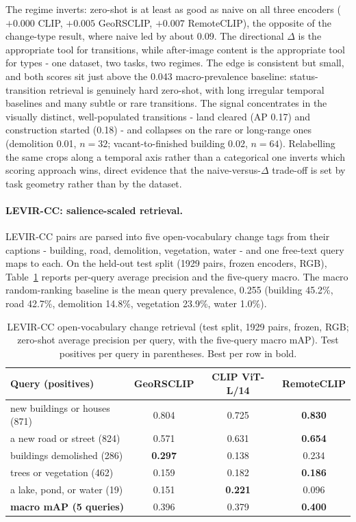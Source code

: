 \documentclass{article}
\begin{document}
The regime inverts: zero-shot is at least as good as naive on all three encoders
($+0.000$ CLIP, $+0.005$ GeoRSCLIP, $+0.007$ RemoteCLIP), the opposite of the
change-type result, where naive led by about 0.09. The directional $\Delta$ is the
appropriate tool for transitions, while after-image content is the appropriate
tool for types - one dataset, two tasks, two regimes. The edge is consistent but
small, and both scores sit just above the 0.043 macro-prevalence baseline:
status-transition retrieval is genuinely hard zero-shot, with long irregular
temporal baselines and many subtle or rare transitions. The signal concentrates in
the visually distinct, well-populated transitions - land cleared (AP 0.17) and
construction started (0.18) - and collapses on the rare or long-range ones
(demolition 0.01, $n=32$; vacant-to-finished building 0.02, $n=64$). Relabelling
the same crops along a temporal axis rather than a categorical one inverts which
scoring approach wins, direct evidence that the naive-versus-$\Delta$ trade-off is
set by task geometry rather than by the dataset.


\paragraph{LEVIR-CC: salience-scaled retrieval.}
LEVIR-CC pairs are parsed into five open-vocabulary change tags from their
captions - building, road, demolition, vegetation, water - and one free-text
query maps to each. On the held-out test split (1929 pairs, frozen encoders,
RGB), Table~\ref{tab:levircc} reports per-query average precision and the
five-query macro. The macro random-ranking baseline is the mean query prevalence,
0.255 (building 45.2\%, road 42.7\%, demolition 14.8\%, vegetation 23.9\%, water
1.0\%).

\begin{table}[H]
    \centering
    \caption{LEVIR-CC open-vocabulary change retrieval (test split, 1929 pairs,
    frozen, RGB; zero-shot average precision per query, with the five-query macro
    mAP). Test positives per query in parentheses. Best per row in bold.}
    \label{tab:levircc}
    \begin{tabular}{lccc}
        \toprule
        \textbf{Query (positives)} & \textbf{GeoRSCLIP} & \textbf{CLIP ViT-L/14} & \textbf{RemoteCLIP} \\
        \midrule
        new buildings or houses (871) & 0.804 & 0.725 & \textbf{0.830} \\
        a new road or street (824)    & 0.571 & 0.631 & \textbf{0.654} \\
        buildings demolished (286)    & \textbf{0.297} & 0.138 & 0.234 \\
        trees or vegetation (462)     & 0.159 & 0.182 & \textbf{0.186} \\
        a lake, pond, or water (19)   & 0.151 & \textbf{0.221} & 0.096 \\
        \midrule
        \textbf{macro mAP (5 queries)} & 0.396 & 0.379 & \textbf{0.400} \\
        \bottomrule
    \end{tabular}
\end{table}
\end{document}
